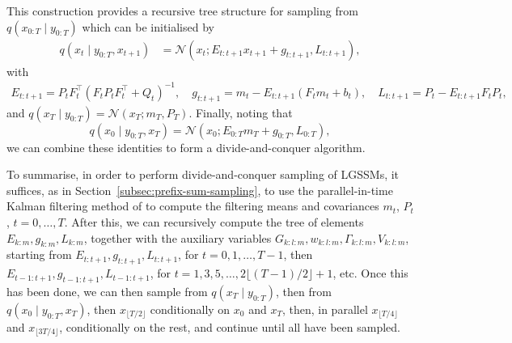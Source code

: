 This construction provides a recursive tree structure for sampling from $q(x_{0:T} \mid y_{0:T})$ which can be initialised by
\begin{equation}
    \begin{split}
        q(x_t \mid y_{0:T}, x_{t+1})
        &= \mathcal{N}(x_t;
        E_{t:t+1} x_{t+1} + g_{t:t+1}, L_{t:t+1} ),
    \end{split}
\end{equation}
with
\begin{equation}
    \label{eq:init-dnc}
    \begin{split}
        E_{t:t+1} = P_t F_t^\top (F_t P_t F_t^\top + Q_t)^{-1}, \quad
        g_{t:t+1} = m_t - E_{t:t+1} (F_t m_t + b_t), \quad
        L_{t:t+1} = P_t - E_{t:t+1} F_t P_t,
    \end{split}
\end{equation}
and $q(x_T \mid y_{0:T}) = \mathcal{N}(x_T; m_T, P_T)$. Finally, noting that
\begin{equation}
    q(x_0 \mid y_{0:T}, x_T) = \mathcal{N}(x_0; E_{0:T} m_T + g_{0:T}, L_{0:T}),
\end{equation}
we can combine these identities to form a divide-and-conquer algorithm.

To summarise, in order to perform divide-and-conquer sampling of LGSSMs, it suffices, as in Section~\ref{subsec:prefix-sum-sampling}, to use the parallel-in-time Kalman filtering method of \citet{Sarkka2021temporal} to compute the filtering means and covariances $m_t$, $P_t$, $t=0, \ldots, T$. After this, we can recursively compute the tree of elements $E_{k:m}, g_{k:m}, L_{k:m}$, together with the auxiliary variables $G_{k:l:m}, w_{k:l:m}, \Gamma_{k:l:m}, V_{k:l:m}$, starting from $E_{t:t+1}, g_{t:t+1}, L_{t:t+1}$, for $t=0, 1, \ldots, T-1$, then $E_{t-1:t+1}, g_{t-1:t+1}, L_{t-1:t+1}$, for $t=1, 3, 5, \ldots, 2\lfloor (T - 1)/2\rfloor + 1$, etc. Once this has been done, we can then sample from $q(x_T \mid y_{0:T})$, then from $q(x_0 \mid y_{0:T}, x_T)$, then $x_{\lfloor T/2 \rfloor}$ conditionally on $x_0$ and $x_T$, then, in parallel $x_{\lfloor T/4 \rfloor}$ and $x_{\lfloor 3 T/4 \rfloor}$, conditionally on the rest, and continue until all have been sampled.